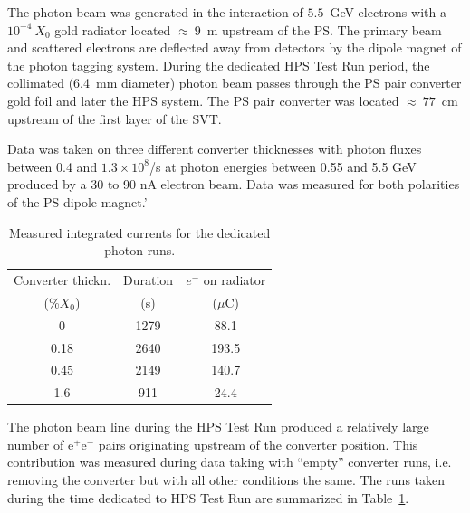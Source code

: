 \documentclass[final,3p,times,twocolumn]{elsarticle}
\newcommand{\ee}{e$^+$e$^-$}
\begin{document}
The photon beam was generated in the interaction of $5.5$~GeV electrons with a $10^{-4}~X_0$ 
gold radiator located $\approx~9$~m upstream of the PS. The primary beam and scattered 
electrons are deflected away from detectors by the dipole magnet of the photon tagging system. 
During the dedicated HPS Test Run period, the collimated (6.4~mm diameter) photon beam passes 
through the PS pair converter gold foil and later the HPS system.
The PS pair converter was located $\approx~77$~cm upstream of the first layer of the SVT.
 
 
 Data was taken on three different converter thicknesses with photon fluxes between 0.4 and 
 $1.3\times10^8$/s at photon energies between 0.55 and 5.5 GeV produced by a 30 to 90 nA electron 
 beam. Data was measured for both polarities of the PS dipole magnet.'
\begin{table}[]
\begin{center}
{\small
\begin{tabular}{|c|c|c|}
\hline
Converter thickn. & Duration &  $e^-$ on radiator \\
 (\%$X_0$) & (s) & ($\mu$C)    \\   
\hline
0    & 1279  &   88.1 \\ %
0.18   & 2640 &   193.5 \\ %
0.45  & 2149 &     140.7 \\ %
1.6   & 911 &   24.4 \\ %
\hline
\end{tabular}
}
\caption{Measured integrated currents for the dedicated photon runs.}
\label{tab:currents}
\end{center}
\end{table}
The photon beam line during the HPS Test Run produced a relatively large number of \ee{} pairs 
originating upstream of the converter position. This contribution was measured during data taking 
with ``empty'' converter runs, i.e. removing the converter but with all other conditions the same. 
The runs taken during the time dedicated to HPS Test Run are summarized in Table~\ref{tab:currents}.
\end{document}

